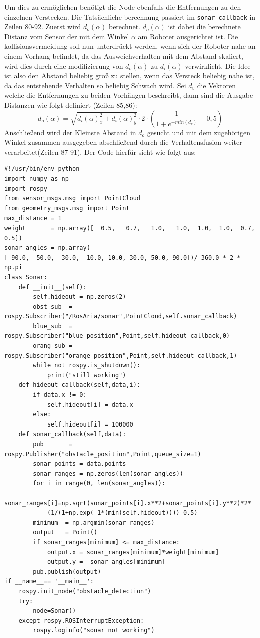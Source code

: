 \documentclass[11pt,a4paper]{article}
\begin{document}
Um dies zu ermöglichen benötigt die Node ebenfalls die Entfernungen zu den einzelnen Verstecken.
Die Tatsächliche berechnung passiert im \texttt{sonar\_callback} in Zeilen 80-92.
Zuerst wird $d_o(\alpha)$ berechnet. $d_o(\alpha)$ ist dabei die berechnete Distanz vom Sensor der mit dem Winkel $\alpha$ am Roboter ausgerichtet ist. Die kollisionsvermeidung soll nun unterdrückt werden, wenn sich der Roboter nahe an einem Vorhang befindet, da das Ausweichverhalten mit dem Abstand skaliert, wird dies durch eine modifizierung von $d_o(\alpha)$ zu $d_i(\alpha)$ verwirklicht. Die Idee ist also den Abstand beliebig groß zu stellen, wenn das Versteck beliebig nahe ist, da das entstehende Verhalten so beliebig Schwach wird.
Sei $d_v$ die Vektoren welche die Entfernungen zu beiden Vorhängen beschreibt, dann sind die Ausgabe Distanzen wie folgt definiert (Zeilen 85,86):   
\begin{equation}
d_o(\alpha)=\sqrt{d_i(\alpha)_x^2+d_i(\alpha)_y^2}\cdot 2\cdot(\frac{1}{1+e^{-min(d_v)}}-0,5)
\end{equation}
Anschließend wird der Kleinste Abstand in $d_o$ gesucht und mit dem zugehörigen Winkel zusammen ausgegeben abschließend durch die Verhaltensfusion weiter verarbeitet(Zeilen 87-91). Der Code hierfür sieht wie folgt aus:
  
\begin{scriptsize}
\begin{linenumbers}
\begin{lstlisting} 
#!/usr/bin/env python
import numpy as np
import rospy
from sensor_msgs.msg import PointCloud
from geometry_msgs.msg import Point
max_distance = 1
weight       = np.array([  0.5,   0.7,   1.0,   1.0,  1.0,  1.0,  0.7,  0.5])
sonar_angles = np.array(
[-90.0, -50.0, -30.0, -10.0, 10.0, 30.0, 50.0, 90.0])/ 360.0 * 2 * np.pi
class Sonar:
    def __init__(self):
        self.hideout = np.zeros(2)
        obst_sub  = rospy.Subscriber("/RosAria/sonar",PointCloud,self.sonar_callback)
        blue_sub  = rospy.Subscriber("blue_position",Point,self.hideout_callback,0)
        orang_sub = rospy.Subscriber("orange_position",Point,self.hideout_callback,1)
        while not rospy.is_shutdown():
            print("still working")
    def hideout_callback(self,data,i):
        if data.x != 0:
            self.hideout[i] = data.x
        else:
            self.hideout[i] = 100000
    def sonar_callback(self,data):
        pub       = rospy.Publisher("obstacle_position",Point,queue_size=1)
        sonar_points = data.points
        sonar_ranges = np.zeros(len(sonar_angles))
        for i in range(0, len(sonar_angles)):
            sonar_ranges[i]=np.sqrt(sonar_points[i].x**2+sonar_points[i].y**2)*2*
            (1/(1+np.exp(-1*(min(self.hideout))))-0.5)
        minimum  = np.argmin(sonar_ranges)
        output   = Point()
        if sonar_ranges[minimum] <= max_distance:
            output.x = sonar_ranges[minimum]*weight[minimum]
            output.y = -sonar_angles[minimum]
        pub.publish(output)
if __name__== '__main__':
    rospy.init_node("obstacle_detection")
    try:
        node=Sonar()
    except rospy.ROSInterruptException:
        rospy.loginfo("sonar not working")
\end{lstlisting} 
\end{linenumbers}
\end{scriptsize}
\end{document}
